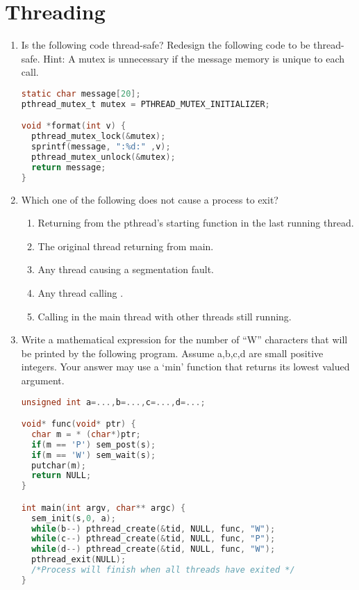 \section{Threading}

\begin{enumerate}

\item Is the following code thread-safe? Redesign the following code to be thread-safe. Hint: A mutex is unnecessary if the message memory is unique to each call.

\begin{lstlisting}[language=C]
static char message[20];
pthread_mutex_t mutex = PTHREAD_MUTEX_INITIALIZER;

void *format(int v) {
  pthread_mutex_lock(&mutex);
  sprintf(message, ":%d:" ,v);
  pthread_mutex_unlock(&mutex);
  return message;
}
\end{lstlisting}

\item Which one of the following does not cause a process to exit?

\begin{enumerate}
\item Returning from the pthread's starting function in the last running thread.
\item The original thread returning from main.
\item Any thread causing a segmentation fault.
\item Any thread calling .
\item Calling  in the main thread with other threads still running.
\end{enumerate}

\item Write a mathematical expression for the number of ``W'' characters that will be printed by the following program. Assume a,b,c,d are small positive integers. Your answer may use a `min' function that returns its lowest valued argument.

\begin{lstlisting}[language=C]
unsigned int a=...,b=...,c=...,d=...;

void* func(void* ptr) {
  char m = * (char*)ptr;
  if(m == 'P') sem_post(s);
  if(m == 'W') sem_wait(s);
  putchar(m);
  return NULL;
}

int main(int argv, char** argc) {
  sem_init(s,0, a);
  while(b--) pthread_create(&tid, NULL, func, "W");
  while(c--) pthread_create(&tid, NULL, func, "P");
  while(d--) pthread_create(&tid, NULL, func, "W");
  pthread_exit(NULL);
  /*Process will finish when all threads have exited */
}
\end{lstlisting}


\end{enumerate}
